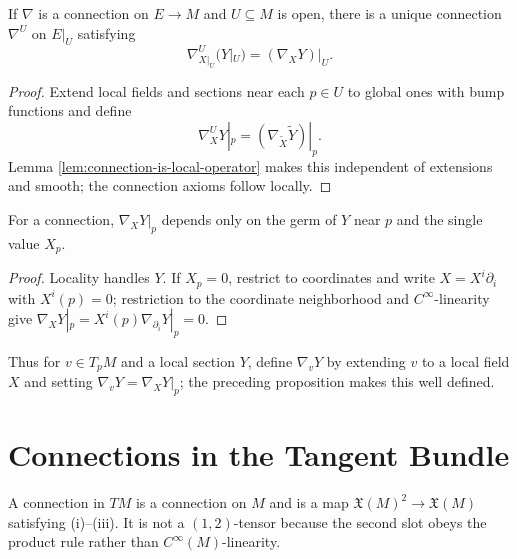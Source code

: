 \begin{proposition}\label{prop:connection-restriction}

If $\nabla$ is a connection on $E\to M$ and $U\subseteq M$ is open, there is a unique connection $\nabla^U$ on $E|_U$ satisfying
\begin{equation}
\nabla^U_{X|_U}(Y|_U)=(\nabla_XY)|_U.\tag{4.6}
\end{equation}
\end{proposition}
\begin{proof}
\sketch Extend local fields and sections near each $p\in U$ to global ones with bump functions and define
\begin{equation}
\nabla^U_XY|_p=(\nabla_{\widetilde X}\widetilde Y)|_p.\tag{4.7}
\end{equation}
Lemma \ref{lem:connection-is-local-operator} makes this independent of extensions and smooth; the connection axioms follow locally.
\end{proof}

\begin{proposition}\label{prop:covariant-deriv-dependence-at-point}





For a connection, $\nabla_XY|_p$ depends only on the germ of $Y$ near $p$ and the single value $X_p$.
\end{proposition}
\begin{proof}

\sketch Locality handles $Y$. If $X_p=0$, restrict to coordinates and write $X=X^i\partial_i$ with $X^i(p)=0$; restriction to the coordinate neighborhood and $C^\infty$-linearity give $\nabla_XY|_p=X^i(p)\nabla_{\partial_i}Y|_p=0$.
\end{proof}

Thus for $v\in T_pM$ and a local section $Y$, define $\nabla_vY$ by extending $v$ to a local field $X$ and setting $\nabla_vY=\nabla_XY|_p$; the preceding proposition makes this well defined.

\section{Connections in the Tangent Bundle}

A connection in $TM$ is a connection on $M$ and is a map $\mathfrak X(M)^2\to\mathfrak X(M)$ satisfying (i)--(iii). It is not a $(1,2)$-tensor because the second slot obeys the product rule rather than $C^\infty(M)$-linearity.

